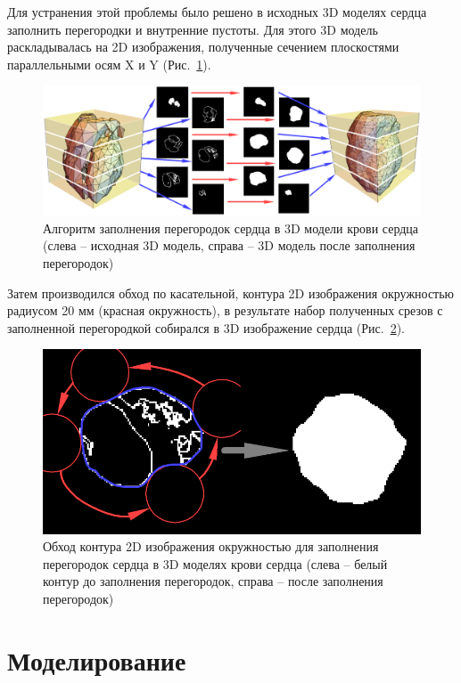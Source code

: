 \documentclass[conference]{IEEEtran}
\begin{document}
Для устранения этой проблемы было решено в исходных 3D моделях сердца заполнить перегородки и внутренние пустоты.
Для этого 3D модель раскладывалась на 2D изображения, полученные сечением плоскостями параллельными осям X и Y (Рис.~\ref{fig:algo}).
\begin{figure}[tbph]
    \centering
    \includegraphics[width=\linewidth]{fig/algo}
    \caption{Алгоритм заполнения перегородок сердца в 3D модели крови сердца (слева –
    исходная 3D модель, справа – 3D модель после заполнения перегородок)}
    \label{fig:algo}
\end{figure}
Затем производился обход по касательной, контура 2D изображения окружностью радиусом
20 мм (красная окружность), в результате набор полученных срезов с заполненной перегородкой собирался в 3D изображение сердца (Рис.~\ref{fig:algo2}).

\begin{figure}[tbph]
    \centering
    \includegraphics[width=\linewidth]{fig/algo2}
    \caption{Обход контура 2D изображения окружностью для заполнения перегородок
    сердца в 3D моделях крови сердца (слева – белый контур до заполнения перегородок,
        справа – после заполнения перегородок)}
    \label{fig:algo2}
\end{figure}

\section{Моделирование}
\end{document}
